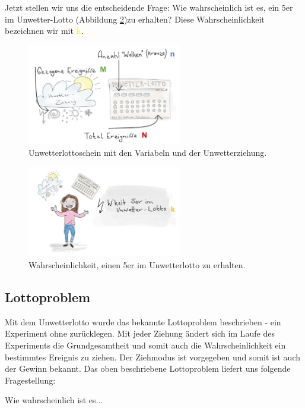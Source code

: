 \begin{refsection}
Jetzt stellen wir uns die entscheidende Frage: 
Wie wahrscheinlich ist es, ein 5er im Unwetter-Lotto (Abbildung \ref{WahrscheinlichkeitUnwetterlotto})zu erhalten? Diese Wahrscheinlichkeit bezeichnen wir mit \textcolor{yellow}{\textbf{k}}.

\begin{figure}
\centering
\includegraphics[width=0.6\textwidth]{extrem/Lottoscheinausgefuellt.pdf}
\caption{Unwetterlottoschein mit den Variabeln und der Unwetterziehung.}
\label{Lottoscheinausgefuellt}
\end{figure}

\begin{figure}
\centering
\includegraphics[width=0.6\textwidth]{extrem/wkeitlotto.pdf}
\caption{Wahrscheinlichkeit, einen 5er im Unwetterlotto zu erhalten.}
\label{WahrscheinlichkeitUnwetterlotto}
\end{figure}


\subsection{Lottoproblem} \label{Lottoproblem}
Mit dem Unwetterlotto wurde das bekannte Lottoproblem beschrieben - ein Experiment ohne zurücklegen. Mit jeder Ziehung ändert sich im Laufe des Experiments die Grundgesamtheit und somit auch die Wahrscheinlichkeit ein bestimmtes Ereignis zu ziehen. Der Ziehmodus ist vorgegeben und somit ist auch der Gewinn bekannt.
Das oben beschriebene Lottoproblem liefert uns folgende Fragestellung:


Wie wahrscheinlich ist es...


\end{refsection}
